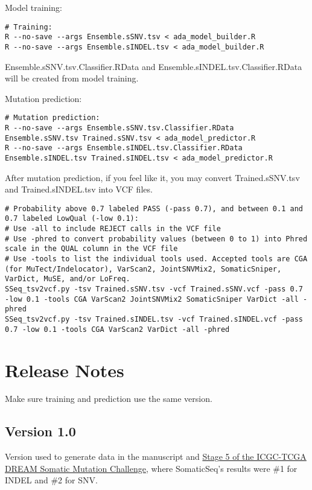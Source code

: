 \documentclass[10pt,letterpaper]{article}
\begin{document}
\begin{sloppypar}
Model training:
\begin{lstlisting}
# Training:
R --no-save --args Ensemble.sSNV.tsv < ada_model_builder.R
R --no-save --args Ensemble.sINDEL.tsv < ada_model_builder.R
\end{lstlisting}
	
Ensemble.sSNV.tsv.Classifier.RData and Ensemble.sINDEL.tsv.Classifier.RData will be created from model training.
	

Mutation prediction:
	
\begin{lstlisting}
# Mutation prediction:
R --no-save --args Ensemble.sSNV.tsv.Classifier.RData Ensemble.sSNV.tsv Trained.sSNV.tsv < ada_model_predictor.R
R --no-save --args Ensemble.sINDEL.tsv.Classifier.RData Ensemble.sINDEL.tsv Trained.sINDEL.tsv < ada_model_predictor.R
\end{lstlisting}

	
After mutation prediction, if you feel like it, you may convert Trained.sSNV.tsv and Trained.sINDEL.tsv into VCF files.

\begin{lstlisting}
# Probability above 0.7 labeled PASS (-pass 0.7), and between 0.1 and 0.7 labeled LowQual (-low 0.1):
# Use -all to include REJECT calls in the VCF file
# Use -phred to convert probability values (between 0 to 1) into Phred scale in the QUAL column in the VCF file
# Use -tools to list the individual tools used. Accepted tools are CGA (for MuTect/Indelocator), VarScan2, JointSNVMix2, SomaticSniper, VarDict, MuSE, and/or LoFreq. 
SSeq_tsv2vcf.py -tsv Trained.sSNV.tsv -vcf Trained.sSNV.vcf -pass 0.7 -low 0.1 -tools CGA VarScan2 JointSNVMix2 SomaticSniper VarDict -all -phred
SSeq_tsv2vcf.py -tsv Trained.sINDEL.tsv -vcf Trained.sINDEL.vcf -pass 0.7 -low 0.1 -tools CGA VarScan2 VarDict -all -phred
\end{lstlisting}







\section{Release Notes}

Make sure training and prediction use the same version.

\subsection{Version 1.0}
Version used to generate data in the manuscript and \href{https://www.synapse.org/#!Synapse:syn312572/wiki/72943}{Stage 5 of the ICGC-TCGA DREAM Somatic Mutation Challenge}, where SomaticSeq's results were \#1 for INDEL and \#2 for SNV. 


\end{sloppypar}
\end{document}
